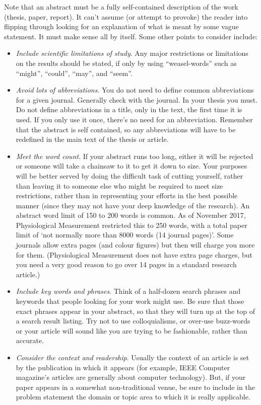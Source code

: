Note that an abstract must be a fully self-contained description of the work (thesis, paper, report). It can't assume (or attempt to provoke) the reader into flipping through looking for an explanation of what is meant by some vague statement. It must make sense all by itself. Some other points to consider include:
\begin{itemize}
\item {\em Include scientific limitations of study}. Any major restrictions or limitations on the results should be stated, if only by using ``weasel-words'' such as ``might'', ``could'', ``may'', and ``seem''.
\item {\em Avoid lots of abbreviations}. You do not need to define common abbreviations for a given journal. Generally check with the journal. In your thesis you must. Do not define abbreviations in a title, only in the text, the first time it is used. If you only use it once, there's no need for an abbreviation. Remember that the abstract is self contained, so any abbreviations will have to be redefined in the main text of the thesis or article. 
\item {\em Meet the word count}. If your abstract runs too long, either it will be rejected or someone will take a chainsaw to it to get it down to size. Your purposes will be better served by doing the difficult task of cutting yourself, rather than leaving it to someone else who might be required to meet size restrictions, rather than in representing your efforts in the best possible manner (since they may not have your deep knowledge of the research). An abstract word limit of 150 to 200 words is common. As of November 2017, Physiological Measurement restricted this to 250 words, with a total paper limit of `not normally more than 8000 words (14 journal pages)'. Some journals allow extra pages (and colour figures) but then will charge you more for them. (Physiological Measurement does not have extra page charges, but you need a very good reason to go over 14 pages in a standard research article.)  
\item {\em Include key words and phrases}. Think of a half-dozen search phrases and keywords that people looking for your work might use. Be sure that those exact phrases appear in your abstract, so that they will turn up at the top of a search result listing. Try not to use colloquialisms, or over-use buzz-words or your article will sound like you are trying to be fashionable, rather than accurate.
\item {\em Consider the context and readership}. Usually the context of an article is set by the publication in which it appears (for example, IEEE Computer magazine's articles are generally about computer technology). But, if your paper appears in a somewhat non-traditional venue, be sure to include in the problem statement the domain or topic area to which it is really applicable. 

\end{itemize}
